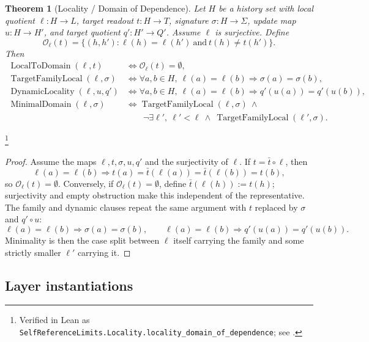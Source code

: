 \documentclass[11pt]{article}
\newtheorem{theorem}{Theorem}[section]
\theoremstyle{definition}
\begin{document}
\begin{theorem}[Locality / Domain of Dependence]\label{thm:F45}
Let \(H\) be a history set with local quotient \(\ell:H\to L\),
target readout \(t:H\to T\), signature \(\sigma:H\to\Sigma\), update
map \(u:H\to H'\), and target quotient \(q':H'\to Q'\). Assume
\(\ell\) is surjective. Define
\[
  \mathcal O_\ell(t)=
  \{(h,h'):\ell(h)=\ell(h')\ \text{and}\ t(h)\ne t(h')\}.
\]
Then
\begin{align*}
  \operatorname{LocalToDomain}(\ell,t)
  &\iff \mathcal O_\ell(t)=\emptyset,\\
  \operatorname{TargetFamilyLocal}(\ell,\sigma)
  &\iff
  \forall a,b\in H,\ \ell(a)=\ell(b)\Rightarrow \sigma(a)=\sigma(b),\\
  \operatorname{DynamicLocality}(\ell,u,q')
  &\iff
  \forall a,b\in H,\ \ell(a)=\ell(b)\Rightarrow q'(u(a))=q'(u(b)),\\
  \operatorname{MinimalDomain}(\ell,\sigma)
  &\iff \operatorname{TargetFamilyLocal}(\ell,\sigma)\ \wedge\\
  &\qquad
  \neg\exists \ell',\ \ell'\!<\ell\ \wedge\
  \operatorname{TargetFamilyLocal}(\ell',\sigma).
\end{align*}
\end{theorem}
\footnote{\raggedright Verified in Lean as
\texttt{SelfReferenceLimits.\allowbreak{}Locality.\allowbreak{}locality\_domain\_of\_dependence};
see \Cref{app:formalization}.}
\begin{proof}
Assume the maps \(\ell,t,\sigma,u,q'\) and the surjectivity of
\(\ell\). If \(t=\bar t\circ\ell\), then
\[
  \ell(a)=\ell(b)\Rightarrow
  t(a)=\bar t(\ell(a))=\bar t(\ell(b))=t(b),
\]
so \(\mathcal O_\ell(t)=\emptyset\). Conversely, if
\(\mathcal O_\ell(t)=\emptyset\), define \(\bar t(\ell(h)):=t(h)\);
surjectivity and empty obstruction make this independent of the
representative. The family and dynamic clauses repeat the same
argument with \(t\) replaced by \(\sigma\) and \(q'\circ u\):
\[
  \ell(a)=\ell(b)\Rightarrow \sigma(a)=\sigma(b),
  \qquad
  \ell(a)=\ell(b)\Rightarrow q'(u(a))=q'(u(b)).
\]
Minimality is then the case split between \(\ell\) itself carrying the
family and some strictly smaller \(\ell'\) carrying it.
\end{proof}

\subsection*{Layer instantiations}\label{layer-inst:F45}
\end{document}
